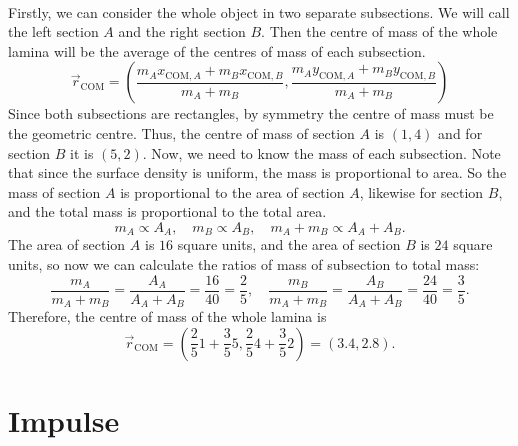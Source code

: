 \documentclass[../classical_mechanics.tex]{subfiles}
\begin{document}
\begin{example}
            \paragraph{}
            Firstly, we can consider the whole object in two separate subsections.
            We will call the left section $A$ and the right section $B$.
            Then the centre of mass of the whole lamina will be the average of the centres of mass of each subsection.
            \begin{equation}
                \vec{r}_\text{COM}=\left(\frac{m_A x_{\text{COM},A}+m_B x_{\text{COM},B}}{m_A+m_B},\frac{m_A y_{\text{COM},A}+m_B y_{\text{COM},B}}{m_A+m_B}\right)
            \end{equation}
            Since both subsections are rectangles, by symmetry the centre of mass must be the geometric centre.
            Thus, the centre of mass of section $A$ is $(1,4)$ and for section $B$ it is $(5,2)$.
            Now, we need to know the mass of each subsection.
            Note that since the surface density is uniform, the mass is proportional to area.
            So the mass of section $A$ is proportional to the area of section $A$, likewise for section $B$, and the total mass is proportional to the total area.
            \begin{equation}
                m_A\propto A_A,\quad m_B\propto A_B,\quad m_A+m_B\propto A_A+A_B.
            \end{equation}
            The area of section $A$ is $16$ square units, and the area of section $B$ is $24$ square units, so now we can calculate the ratios of mass of subsection to total mass:
            \begin{equation}
                \frac{m_A}{m_A+m_B}=\frac{A_A}{A_A+A_B}=\frac{16}{40}=\frac{2}{5},\quad\frac{m_B}{m_A+m_B}=\frac{A_B}{A_A+A_B}=\frac{24}{40}=\frac{3}{5}.
            \end{equation}
            Therefore, the centre of mass of the whole lamina is
            \begin{equation}
                \vec{r}_\text{COM}=\left(\frac{2}{5}1+\frac{3}{5}5,\frac{2}{5}4+\frac{3}{5}2\right)=(3.4,2.8).
            \end{equation}
        \end{example}

    \section{Impulse}
\end{document}
